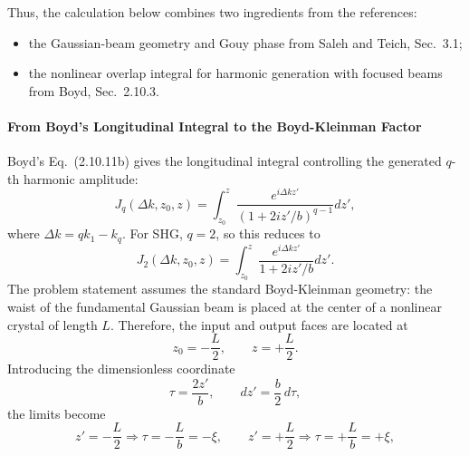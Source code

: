 \begin{resolucao}[Solution]
        Thus, the calculation below combines two ingredients from the references:
        \begin{itemize}
            \item the Gaussian-beam geometry and Gouy phase from Saleh and Teich, Sec.~3.1;
            \item the nonlinear overlap integral for harmonic generation with focused beams from Boyd, Sec.~2.10.3.
        \end{itemize}

    \paragraph*{From Boyd's Longitudinal Integral to the Boyd-Kleinman Factor}
        Boyd's Eq.~(2.10.11b) gives the longitudinal integral controlling the generated $q$-th harmonic amplitude:
        \begin{equation}
            J_q(\Delta k,z_0,z)
            =
            \int_{z_0}^{z}
            \frac{
            e^{i\Delta k z'}
            }{
            \left(1+2iz'/b\right)^{q-1}
            }
            dz',
            \label{eq:boyd_Jq_dimensional}
        \end{equation}
        where $\Delta k=qk_1-k_q$. For SHG, $q=2$, so this reduces to
        \begin{equation}
            J_2(\Delta k,z_0,z)
            =
            \int_{z_0}^{z}
            \frac{
            e^{i\Delta k z'}
            }{
            1+2iz'/b
            }
            dz'.
            \label{eq:J2_dimensional}
        \end{equation}
        The problem statement assumes the standard Boyd-Kleinman geometry: the waist of the fundamental Gaussian beam is placed at the center of a nonlinear crystal of length $L$. Therefore, the input and output faces are located at
        \begin{equation}
            z_0=-\frac{L}{2},
            \qquad
            z=+\frac{L}{2}.
        \end{equation}
        Introducing the dimensionless coordinate
        \begin{equation}
            \tau = \frac{2z'}{b},
            \qquad
            dz'=\frac{b}{2}\,d\tau,
        \end{equation}
        the limits become
        \begin{equation}
            z'=-\frac{L}{2}\Rightarrow \tau=-\frac{L}{b}=-\xi,
            \qquad
            z'=+\frac{L}{2}\Rightarrow \tau=+\frac{L}{b}=+\xi,

\end{equation}
\end{resolucao}
